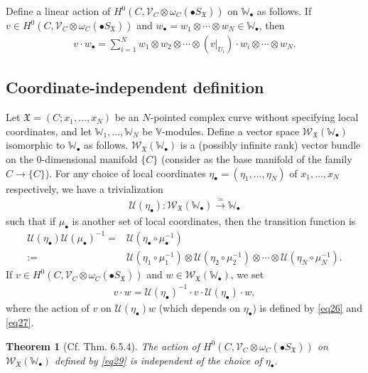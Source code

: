 \documentclass[12pt,a4paper,notitlepage]{article}
\theoremstyle{definition}
\theoremstyle{plain}
\newtheorem{thm}[df]{Theorem}
\newcommand{\fk}{\mathfrak}
\newcommand{\mc}{\mathcal}
\newcommand{\scr}{\mathscr}
\newcommand{\blt}{\bullet}
\newcommand{\Vbb}{\mathbb V}
\newcommand{\Wbb}{\mathbb W}
\numberwithin{equation}{section}
\begin{document}
Define a linear action of $H^0(C,\scr V_C\otimes\omega_C(\blt S_{\fk X}))$ on $\Wbb_\blt$ as follows.  
If $v\in H^0(C,\scr V_C\otimes\omega_C(\blt S_{\fk X}))$ and $w_\blt=w_1\otimes\cdots\otimes w_N\in\Wbb_\blt$, then
\begin{align}
v\cdot w_\blt=\sum_{i=1}^N w_1\otimes w_2\otimes\cdots \otimes (v|_{U_i})\cdot w_i \otimes\cdots\otimes w_N.\label{eq27}
\end{align}




\subsection*{Coordinate-independent definition}


Let $\fk X=(C;x_1,\dots,x_N)$ be an $N$-pointed complex curve without specifying local coordinates, and let $\Wbb_1,\dots,\Wbb_N$ be $\Vbb$-modules. Define a vector space $\scr W_{\fk X}(\Wbb_\blt)$ isomorphic to $\Wbb_\blt$ as follows. $\scr W_{\fk X}(\Wbb_\blt)$ is a (possibly infinite rank) vector bundle on the $0$-dimensional manifold $\{C\}$ (consider as the base manifold of the family $C\rightarrow \{C\}$). \index{WX@$\scr W_{\fk X}(\Wbb_\blt)$} For any choice of local coordinates $\eta_\blt=(\eta_1,\dots,\eta_N)$ of $x_1,\dots,x_N$ respectively, we have a trivialization \index{U@$\mc U(\eta_\blt)$}
\begin{align}
\mc U(\eta_\blt):\scr W_{\fk X}(\Wbb_\blt)\xrightarrow{\simeq} \Wbb_\blt  \label{eq34}
\end{align}
such that if $\mu_\blt$ is another set of local coordinates, then the transition function is
\begin{align}
\mc U(\eta_\blt)\mc U(\mu_\blt)^{-1}=&\mc U(\eta_\blt\circ\mu_\blt^{-1})\nonumber\\
:=&\mc U(\eta_1\circ\mu_1^{-1})\otimes \mc U(\eta_2\circ\mu_2^{-1})\otimes\cdots\otimes \mc U(\eta_N\circ\mu_N^{-1}).\label{eq32}
\end{align}
If $v\in H^0(C,\scr V_C\otimes\omega_C(\blt S_{\fk X}))$ and $w\in\scr W_{\fk X}(\Wbb_\blt)$, we set
\begin{align}
v\cdot w=\mc U(\eta_\blt)^{-1}\cdot v\cdot\mc U(\eta_\blt)\cdot w,\label{eq29}
\end{align}
where the action of $v$ on $\mc U(\eta_\blt)w$ (which depends on $\eta_\blt$) is defined by \eqref{eq26} and \eqref{eq27}.

\begin{thm}[Cf. \cite{FB04} Thm. 6.5.4]\label{lb13}
The action of $H^0(C,\scr V_C\otimes\omega_C(\blt S_{\fk X}))$ on $\scr W_{\fk X}(\Wbb_\blt)$  defined by \eqref{eq29} is independent of the choice of $\eta_\blt$.
\end{thm}
\end{document}
